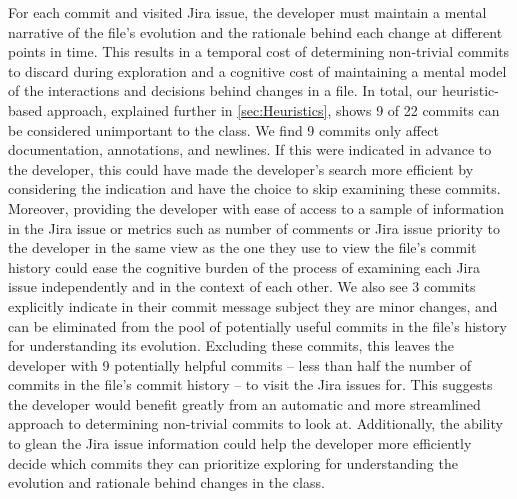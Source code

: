 For each commit and visited Jira issue, the developer must maintain a mental narrative of the file's evolution and the rationale behind each change at different points in time. 
This results in a temporal cost of determining non-trivial commits to discard during exploration and a cognitive cost of maintaining a mental model of the interactions and decisions behind changes in a file. 
In total, our heuristic-based approach, explained further in \autoref{sec:Heuristics}, shows 9 of 22 commits can be considered unimportant to the  class. 
We find 9 commits only affect documentation, annotations, and newlines.
If this were indicated in advance to the developer, this could have made the developer's search more efficient by considering the indication and have the choice to skip examining these commits.
Moreover, providing the developer with ease of access to a sample of information in the Jira issue or metrics such as number of comments or Jira issue priority to the developer in the same view as the one they use to view the file's commit history could ease the cognitive burden of the process of examining each Jira issue independently and in the context of each other.
We also see 3 commits explicitly indicate in their commit message subject they are minor changes, and can be eliminated from the pool of potentially useful commits in the file's history for understanding its evolution.
Excluding these commits, this leaves the developer with 9 potentially helpful commits -- less than half the number of commits in the file's commit history -- to visit the Jira issues for.
This suggests the developer would benefit greatly from an automatic and more streamlined approach to determining non-trivial commits to look at.
Additionally, the ability to glean the Jira issue information could help the developer more efficiently decide which commits they can prioritize exploring for understanding the evolution and rationale behind changes in the  class.

